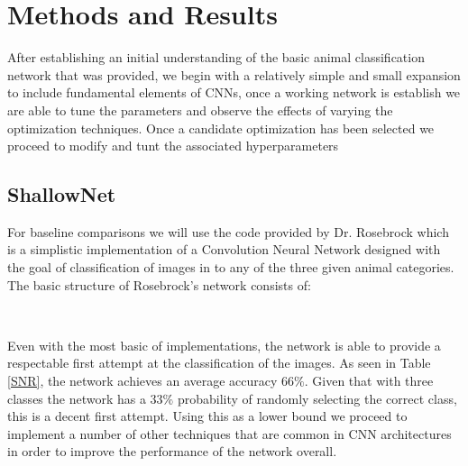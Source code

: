 \documentclass[12pt]{article}
\begin{document}
\section{Methods and Results}
After establishing an initial understanding of the basic  animal classification network that was provided, we begin with a relatively simple and small expansion to include fundamental elements of CNNs, once a working network is establish we are able to tune the parameters and observe the effects of varying the optimization techniques. Once a candidate optimization has been selected we proceed to modify and tunt the associated hyperparameters

\subsection{ShallowNet}
For baseline comparisons we will use the code provided by Dr. Rosebrock \cite{rosebrock} which is a simplistic implementation of a Convolution Neural Network designed with the goal of classification of images in to any of the three given animal categories. The basic structure of Rosebrock's network consists of:
\begin{center}
	 \\
\end{center}
Even with the most basic of implementations, the network is able to provide a respectable first attempt at the classification of the images. As seen in Table \ref{SNR}, the network achieves an average accuracy $66\%$. Given that with three classes the network has a $33\%$ probability of randomly selecting the correct class, this is a decent first attempt. Using this as a lower bound we proceed to implement a number of other techniques that are common in CNN architectures in order to improve the performance of the network overall. 
\end{document}
